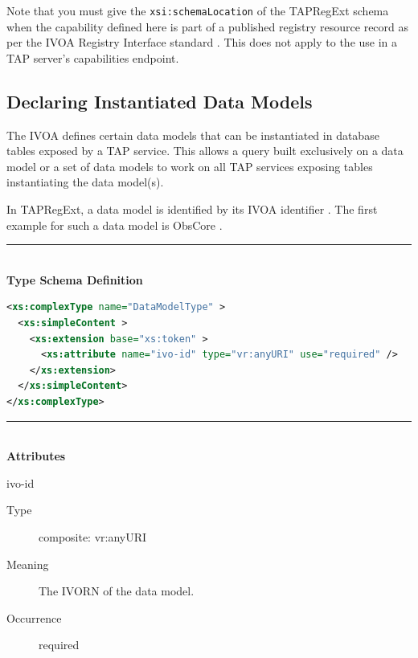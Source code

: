 \documentclass{ivoa}
\begin{document}
Note that you must give the \texttt{xsi:schemaLocation} of
the TAPRegExt schema when the capability defined here is part of a published
registry resource record as per the IVOA Registry Interface standard 
\citep{std:RI1}.  This does not apply to the use
in a TAP server's capabilities endpoint.


\subsection{Declaring Instantiated Data Models}

\label{dms}

The IVOA defines certain data models that can be instantiated in database
tables exposed by a TAP service.  This allows a query built exclusively
on a data model or a set of data models to work on all TAP services exposing
tables instantiating the data model(s).

In TAPRegExt, a data model is identified by its IVOA identifier
\citep{std:VOID}.  The first example for such a data model is ObsCore
\citep{ref:OBSCORE}.

\noindent\rule[-2pt]{\textwidth}{0.5pt}\\
			\textbf{ Type Schema Definition}

\begin{lstlisting}[language=XML]
<xs:complexType name="DataModelType" >
  <xs:simpleContent >
    <xs:extension base="xs:token" >
      <xs:attribute name="ivo-id" type="vr:anyURI" use="required" />
    </xs:extension>
  </xs:simpleContent>
</xs:complexType>
\end{lstlisting}

\noindent\rule[-2pt]{\textwidth}{0.5pt}\\
					\textbf{ Attributes}

\begin{bigdescription}
\item[ivo-id]
\begin{description}
\item[Type\quad] composite: vr:anyURI
\item[Meaning\quad] 
            The IVORN of the data model.
            
\item[Occurrence\quad] required
\end{description}


\end{bigdescription}
\end{document}
